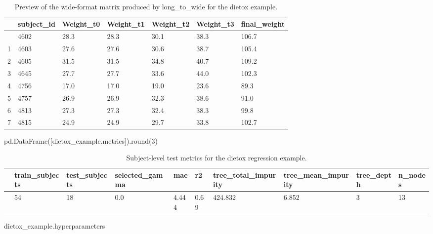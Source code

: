 \documentclass[
  letterpaper,
  DIV=11,
  numbers=noendperiod]{scrartcl}
\newenvironment{Shaded}{\begin{snugshade}}{\end{snugshade}}
\newcommand{\BuiltInTok}[1]{\textcolor[rgb]{0.00,0.23,0.31}{#1}}
\newcommand{\DecValTok}[1]{\textcolor[rgb]{0.68,0.00,0.00}{#1}}
\newcommand{\NormalTok}[1]{\textcolor[rgb]{0.00,0.23,0.31}{#1}}
\begin{document}
\begin{longtable}[]{@{}lllllll@{}}

\caption{\label{tbl-dietox-wide-preview}Preview of the wide-format
matrix produced by long\_to\_wide for the dietox example.}

\tabularnewline

\toprule\noalign{}
& subject\_id & Weight\_t0 & Weight\_t1 & Weight\_t2 & Weight\_t3 &
final\_weight \\
\midrule\noalign{}
\endhead
\bottomrule\noalign{}
\endlastfoot
0 & 4602 & 28.3 & 28.3 & 30.1 & 38.3 & 106.7 \\
1 & 4603 & 27.6 & 27.6 & 30.6 & 38.7 & 105.4 \\
2 & 4605 & 31.5 & 31.5 & 34.8 & 40.7 & 109.2 \\
3 & 4645 & 27.7 & 27.7 & 33.6 & 44.0 & 102.3 \\
4 & 4756 & 17.0 & 17.0 & 19.0 & 23.6 & 89.3 \\
5 & 4757 & 26.9 & 26.9 & 32.3 & 38.6 & 91.0 \\
6 & 4813 & 27.3 & 27.3 & 32.4 & 38.3 & 99.8 \\
7 & 4815 & 24.9 & 24.9 & 29.7 & 33.8 & 102.7 \\

\end{longtable}

\begin{Shaded}
\begin{Highlighting}[]
\NormalTok{pd.DataFrame([dietox\_example.metrics]).}\BuiltInTok{round}\NormalTok{(}\DecValTok{3}\NormalTok{)}
\end{Highlighting}
\end{Shaded}

\begin{longtable}[]{@{}llllllllll@{}}

\caption{\label{tbl-dietox-metrics}Subject-level test metrics for the
dietox regression example.}

\tabularnewline

\toprule\noalign{}
& train\_subjects & test\_subjects & selected\_gamma & mae & r2 &
tree\_total\_impurity & tree\_mean\_impurity & tree\_depth & n\_nodes \\
\midrule\noalign{}
\endhead
\bottomrule\noalign{}
\endlastfoot
0 & 54 & 18 & 0.0 & 4.444 & 0.69 & 424.832 & 6.852 & 3 & 13 \\

\end{longtable}

\begin{Shaded}
\begin{Highlighting}[]
\NormalTok{dietox\_example.hyperparameters}
\end{Highlighting}
\end{Shaded}
\end{document}
